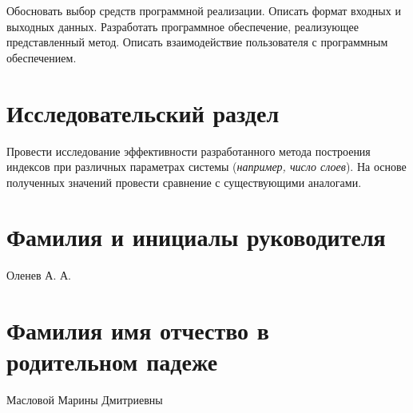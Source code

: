 \documentclass{bmstu}
\begin{document}
Обосновать выбор средств программной реализации. Описать формат входных и
выходных данных. Разработать программное обеспечение, реализующее представленный
метод. Описать взаимодействие пользователя с программным обеспечением.

\section*{Исследовательский раздел}

Провести исследование эффективности разработанного метода построения индексов
при различных параметрах системы (\textit{например, число слоев}). На основе
полученных значений провести сравнение с существующими аналогами.

\section*{Фамилия и инициалы руководителя}

Оленев А. А.

\section*{Фамилия имя отчество в родительном падеже}

Масловой Марины Дмитриевны
\end{document}
